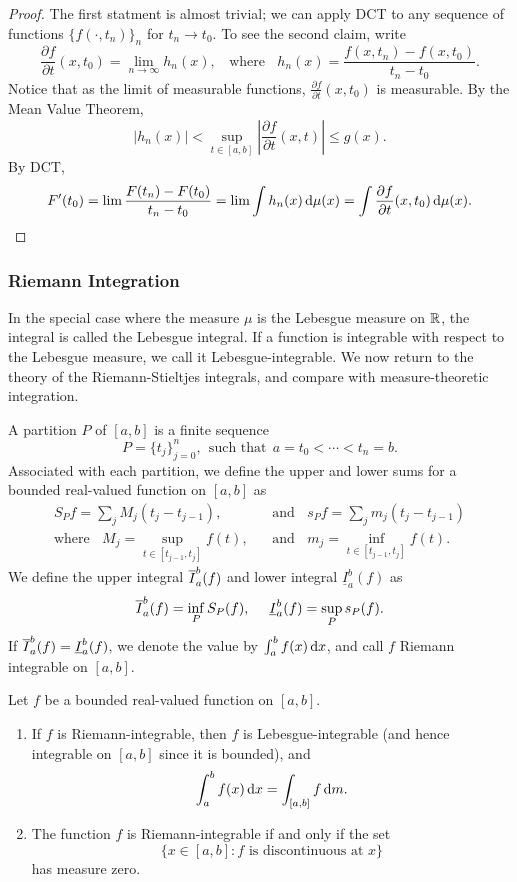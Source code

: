\documentclass[12pt]{article} %
\begin{document}
\begin{proof}
    The first statment is almost trivial; we can apply DCT to any sequence of functions $\{f(\cdot, t_n)\}_n$ for $t_n \to t_0$. To see the second claim, write \[\frac{\partial f}{\partial t}(x, t_0) = \lim_{n \to \infty} h_n(x), \ \ \ \ \text{where} \ \ \ \ h_n(x) = \frac{f(x, t_n) - f(x, t_0)}{t_n - t_0}.\] Notice that as the limit of measurable functions, $\frac{\partial f}{\partial t}(x, t_0)$ is measurable. By the Mean Value Theorem, \[|h_n(x)| < \sup_{t \in [a,b]} \left|\frac{\partial f}{\partial t} (x, t) \right| \leq g(x).\] By DCT, \[F'(t_0) = \lim \frac{F(t_n) - F(t_0)}{t_n - t_0} = \lim \int h_n(x) \, \mathrm{d} \mu(x) = \int \frac{\partial f}{\partial t} (x, t_0) \, \mathrm{d} \mu(x).\]
\end{proof}

\subsubsection{Riemann Integration}

In the special case where the measure $\mu$ is the Lebesgue measure on $\mathbb{R}$, the integral is called the Lebesgue integral. If a function is integrable with respect to the Lebesgue measure, we call it Lebesgue-integrable. We now return to the theory of the Riemann-Stieltjes integrals, and compare with measure-theoretic integration.

\begin{definition}
    A partition $P$ of $[a, b]$ is a finite sequence \[P = \{t_j\}_{j=0}^{n}, \ \ \text{such that} \ \ a =t_0 < \cdots < t_n = b.\] Associated with each partition, we define the upper and lower sums for a bounded real-valued function on $[a, b]$ as \begin{align*}
        S_{P}f = \sum_j M_j(t_j - t_{j-1}), \ \ \ \ &\text{and} \ \ \ \ s_{P}f = \sum_j m_j (t_j - t_{j-1})\\
        \text{where} \ \ \ \ M_j = \sup_{t \in [t_{j-1}, t_j]}f(t), \ \ \ \ &\text{and} \ \ \ \ m_j = \inf_{t \in [t_{j-1}, t_j]}f(t).
    \end{align*} We define the upper integral $\overline{I}_a^b(f)$ and lower integral $\underline{I}_a^b(f)$ as \[\ol{I}_a^b(f) = \inf_{P} S_P (f), \ \ \ \ \underline{I}_a^b(f) = \sup_{P}s_P(f).\] If $\overline{I}_a^b(f) = \underline{I}_a^b(f)$, we denote the value by $\int_a^b f(x) \, \mathrm{d} x$, and call $f$ Riemann integrable on $[a, b]$.
\end{definition}

\begin{theorem}
    Let $f$ be a bounded real-valued function on $[a, b]$. \begin{enumerate}
        \item If $f$ is Riemann-integrable, then $f$ is Lebesgue-integrable (and hence integrable on $[a,b]$ since it is bounded), and \[\int_a^b f(x) \, \mathrm{d} x = \int_{[a, b]} f \, \mathrm{d} m.\]
        \item The function $f$ is Riemann-integrable if and only if the set \[\{x \in [a, b] : \text{$f$ is discontinuous at $x$}\}\] has measure zero.
    \end{enumerate}
\end{theorem}
\end{document}
